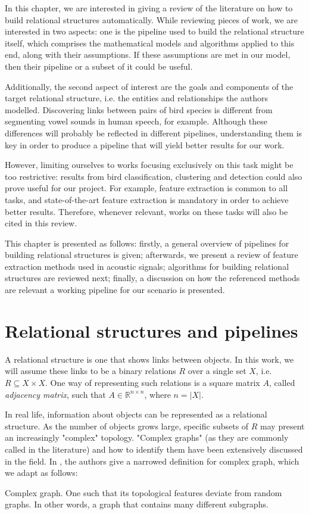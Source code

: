 \documentclass[../main.tex]{subfiles}
\begin{document}
In this chapter, we are interested in giving a review of the literature on how to build relational structures automatically. While reviewing pieces of work, we are interested in two aspects: one is the pipeline used to build the relational structure itself, which comprises the mathematical models and algorithms applied to this end, along with their assumptions. If these assumptions are met in our model, then their pipeline or a subset of it could be useful.
\par Additionally, the second aspect of interest are the goals and components of the target relational structure, i.e. the entities and relationships the authors modelled. Discovering links between pairs of bird species is different from segmenting vowel sounds in human speech, for example. Although these differences will probably be reflected in different pipelines, understanding them is key in order to produce a pipeline that will yield better results for our work.
\par However, limiting ourselves to works focusing exclusively on this task might be too restrictive: results from bird classification, clustering and detection could also prove useful for our project. For example, feature extraction is common to all tasks, and state-of-the-art feature extraction is mandatory in order to achieve better results. Therefore, whenever relevant, works on these tasks will also be cited in this review.
\par This chapter is presented as follows: firstly, a general overview of pipelines for building relational structures is given; afterwards, we present a review of feature extraction methods used in acoustic signals; algorithms for building relational structures are reviewed next; finally, a discussion on how the referenced methods are relevant a working pipeline for our scenario is presented.

\section{Relational structures and pipelines}
A relational structure is one that shows links between objects. In this work, we will assume these links to be a binary relations $R$ over a single set $X$, i.e. $R \subseteq X \times X$. One way of representing such relations is a square matrix $A$, called \emph{adjacency matrix}, such that $A \in \mathbb{R}^{n \times n}$, where $n =\left\vert{X}\right\vert$.
\par In real life, information about objects can be represented as a relational structure. As the number of objects grows large, specific subsets of $R$ may present an increasingly "complex" topology. "Complex graphs" (as they are commonly called in the literature) and how to identify them have been extensively discussed in the field. In \cite{Kim2008}, the authors give a narrowed definition for complex graph, which we adapt as follows:
\theoremstyle{definition}
\begin{definition}{Complex graph}. One such that its topological features deviate from random graphs. In other words, a graph that contains many different subgraphs.
\end{definition}
\par 
\end{document}
